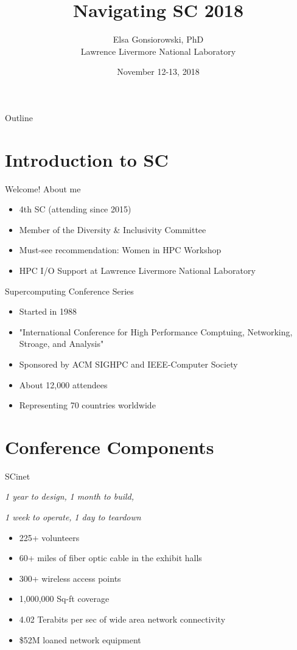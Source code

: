 \documentclass[presentation,xcolor=table]{beamer}
\author{Elsa Gonsiorowski, PhD\\Lawrence Livermore National Laboratory}
\date{November 12-13, 2018}
\title{Navigating SC 2018}
\begin{document}
\maketitle
\begin{frame}{Outline}
\tableofcontents
\end{frame}


\section{Introduction to SC}
\label{sec:org03e62b7}

\begin{frame}[label={sec:org8d7533c}]{Welcome!}
\alert{About me}
\begin{itemize}
\item 4th SC (attending since 2015)
\item Member of the Diversity \& Inclusivity Committee
\item Must-see recommendation: Women in HPC Workshop
\item HPC I/O Support at Lawrence Livermore National Laboratory
\end{itemize}
\end{frame}

\begin{frame}[label={sec:orga99d8a5}]{Supercomputing Conference Series}
\begin{itemize}
\item Started in 1988
\item "International Conference for High Performance Comptuing, Networking, Stroage, and Analysis"
\item Sponsored by ACM SIGHPC and IEEE-Computer Society
\item About 12,000 attendees
\item Representing 70 countries worldwide
\end{itemize}
\end{frame}

\section{Conference Components}
\label{sec:org10c1e42}

\begin{frame}[label={sec:org16a8ba4}]{SCinet}
\begin{center}
\emph{1 \alert{year} to design,}
\emph{1 \alert{month} to build,}

\emph{1 \alert{week} to operate,}
\emph{1 \alert{day} to teardown}
\end{center}

\begin{itemize}
\item 225+ volunteers
\item 60+ miles of fiber optic cable in the exhibit halls
\item 300+ wireless access points
\item 1,000,000 Sq-ft coverage
\item 4.02 Terabits per sec of wide area network connectivity
\item \$52M loaned network equipment
\end{itemize}
\end{frame}
\end{document}
